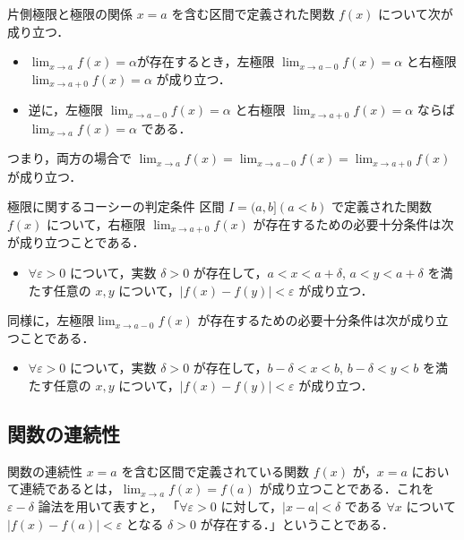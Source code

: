 \documentclass[a4paper]{ltjsarticle}
\begin{document}
  \begin{theorem}{片側極限と極限の関係}{}
    $x = a$ を含む区間で定義された関数 $f(x)$ について次が成り立つ．
    \begin{itemize}
     \item $\lim_{x \to a} f(x) = \alpha$が存在するとき，左極限 $\lim_{x \to a -0} f(x) = \alpha$ と右極限 $\lim_{x \to a + 0} f(x) = \alpha$ が成り立つ．
     \item 逆に，左極限 $\lim_{x \to a -0} f(x) = \alpha$ と右極限 $\lim_{x \to a + 0} f(x) = \alpha$ ならば $\lim_{x \to a} f(x) = \alpha$ である．
    \end{itemize}
    つまり，両方の場合で $\lim_{x \to a} f(x) = \lim_{x \to a - 0} f(x) = \lim_{x \to a+0} f(x)$ が成り立つ．
  \end{theorem}

  \begin{theorem}{極限に関するコーシーの判定条件}{}
    区間 $I = (a, b] (a < b)$ で定義された関数 $f(x)$ について，右極限 $\lim_{x \to a+0} f(x)$ が存在するための必要十分条件は次が成り立つことである．
    \begin{itemize}
      \item $\forall \varepsilon > 0$ について，実数 $\delta > 0$ が存在して，$a < x < a + \delta$, $a < y < a + \delta$ を満たす任意の $x, y$ について，$|f(x) - f(y)| < \varepsilon$ が成り立つ．
    \end{itemize}
    同様に，左極限$\lim_{x \to a-0} f(x)$ が存在するための必要十分条件は次が成り立つことである．
    \begin{itemize}
      \item $\forall \varepsilon > 0$ について，実数 $\delta > 0$ が存在して，$b-\delta < x < b$, $b-\delta < y < b$ を満たす任意の $x, y$ について，$|f(x) - f(y)| < \varepsilon$ が成り立つ．
    \end{itemize}
  \end{theorem}

  \subsection{関数の連続性}
  \begin{tcb}{関数の連続性}{}
    $x = a$ を含む区間で定義されている関数 $f(x)$ が，$x = a$ において連続であるとは，$\lim_{x \to a} f(x) = f(a)$ が成り立つことである．これを $\varepsilon - \delta$ 論法を用いて表すと，
    「$\forall \varepsilon > 0$ に対して，$|x - a| < \delta$ である $\forall x$  について $|f(x) - f(a)| < \varepsilon$ となる $\delta > 0$ が存在する．」ということである．
  \end{tcb}
\end{document}
